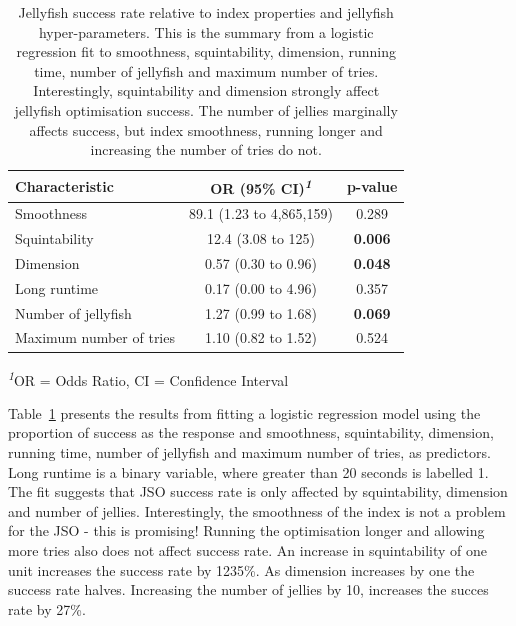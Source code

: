 \documentclass[
  12pt,
]{interact}
\theoremstyle{plain}
\begin{document}
\begingroup
\fontsize{12.0pt}{14.4pt}\selectfont
\setlength{\LTpost}{0mm}

\begin{longtable}{lcc}

\caption{\label{tbl-mod-output}Jellyfish success rate relative to index
properties and jellyfish hyper-parameters. This is the summary from a
logistic regression fit to smoothness, squintability, dimension, running
time, number of jellyfish and maximum number of tries. Interestingly,
squintability and dimension strongly affect jellyfish optimisation
success. The number of jellies marginally affects success, but index
smoothness, running longer and increasing the number of tries do not.}

\tabularnewline

\toprule
\textbf{Characteristic} & \textbf{OR} \textbf{(95\% CI)}\textsuperscript{\textit{1}} & \textbf{p-value} \\ 
\midrule\addlinespace[2.5pt]
Smoothness & 89.1 (1.23 to 4,865,159) & 0.289 \\ 
Squintability & 12.4 (3.08 to 125) & {\bfseries 0.006} \\ 
Dimension & 0.57 (0.30 to 0.96) & {\bfseries 0.048} \\ 
Long runtime & 0.17 (0.00 to 4.96) & 0.357 \\ 
Number of jellyfish & 1.27 (0.99 to 1.68) & {\bfseries 0.069} \\ 
Maximum number of tries & 1.10 (0.82 to 1.52) & 0.524 \\ 
\bottomrule

\end{longtable}

\begin{minipage}{\linewidth}
\textsuperscript{\textit{1}}OR = Odds Ratio, CI = Confidence Interval\\
\end{minipage}
\endgroup

Table~\ref{tbl-mod-output} presents the results from fitting a logistic
regression model using the proportion of success as the response and
smoothness, squintability, dimension, running time, number of jellyfish
and maximum number of tries, as predictors. Long runtime is a binary
variable, where greater than 20 seconds is labelled 1. The fit suggests
that JSO success rate is only affected by squintability, dimension and
number of jellies. Interestingly, the smoothness of the index is not a
problem for the JSO - this is promising! Running the optimisation longer
and allowing more tries also does not affect success rate. An increase
in squintability of one unit increases the success rate by 1235\%. As
dimension increases by one the success rate halves. Increasing the
number of jellies by 10, increases the succes rate by 27\%.
\end{document}

